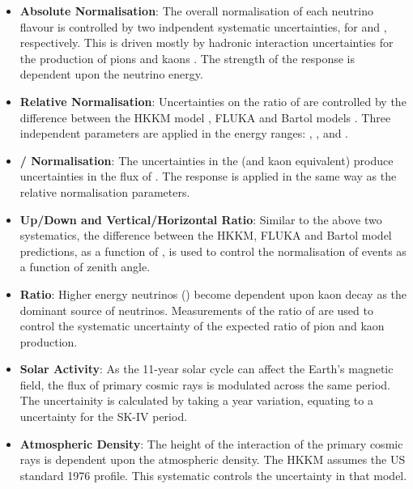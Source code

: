 \begin{itemize}
\item \textbf{Absolute Normalisation}: The overall normalisation of each neutrino flavour is controlled by two indpendent systematic uncertainties, for  and , respectively. This is driven mostly by hadronic interaction uncertainties for the production of pions and kaons \cite{Honda_2007}. The strength of the response is dependent upon the neutrino energy.
\item \textbf{Relative Normalisation}: Uncertainties on the ratio of  are controlled by the difference between the HKKM model \cite{Honda_2007}, FLUKA \cite{etde_20239111} and Bartol models \cite{Barr_2004}. Three independent parameters are applied in the energy ranges: , , and .
\item \textbf{\quickmath{\nu}/\quickmath{\bar{\nu}} Normalisation}: The uncertainties in the \quickmath{\pi^{+}/\pi^{-}} (and kaon equivalent) produce uncertainties in the flux of \quickmath{\nu/\bar{\nu}}. The response is applied in the same way as the relative normalisation parameters.
\item \textbf{Up/Down and Vertical/Horizontal Ratio}: Similar to the above two systematics, the difference between the HKKM, FLUKA and Bartol model predictions, as a function of , is used to control the normalisation of events as a function of zenith angle.
\item{\textbf{ Ratio}}: Higher energy neutrinos () become dependent upon kaon decay as the dominant source of neutrinos. Measurements of the ratio of  \cite{Ambrosini1998-er} are used to control the systematic uncertainty of the expected ratio of pion and kaon production.
\item \textbf{Solar Activity}: As the 11-year solar cycle can affect the Earth's magnetic field, the flux of primary cosmic rays is modulated across the same period. The uncertainity is calculated by taking a  year variation, equating to a  uncertainty for the SK-IV period.
\item \textbf{Atmospheric Density}: The height of the interaction of the primary cosmic rays is dependent upon the atmospheric density. The HKKM assumes the US standard 1976 \cite{USStandardAtm} profile. This systematic controls the uncertainty in that model.
\end{itemize}

